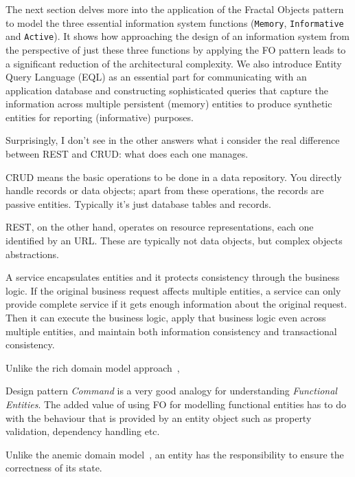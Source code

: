 \documentclass[a4paper,12pt,oneside,openright,final]{memoir} %
\begin{document}
	The next section delves more into the application of the Fractal Objects pattern to model the three essential information system functions (\texttt{Memory}, \texttt{Informative} and \texttt{Active}).
	It shows how approaching the design of an information system from the perspective of just these three functions by applying the FO pattern leads to a significant reduction of the architectural complexity.
	We also introduce Entity Query Language (EQL) as an essential part for communicating with an application database and constructing sophisticated queries that capture the information across multiple persistent (memory) entities to produce synthetic entities for reporting (informative) purposes.


\iffalse


	Surprisingly, I don't see in the other answers what i consider the real difference between REST and CRUD: what does each one manages.

	CRUD means the basic operations to be done in a data repository. You directly handle records or data objects; apart from these operations, the records are passive entities. Typically it's just database tables and records.

	REST, on the other hand, operates on resource representations, each one identified by an URL. These are typically not data objects, but complex objects abstractions.


	
	A service encapsulates entities and it protects consistency through the business logic. 
	If the original business request affects multiple entities, a service can only provide complete service if it gets enough information about the original request.
	Then it can execute the business logic, apply that business logic even across multiple entities, and maintain both information consistency and transactional consistency.
	
	

	Unlike the rich domain model approach~\cite{evans2003},
	
	
	Design pattern \emph{Command} is a very good analogy for understanding \emph{Functional Entities}.
	The added value of using FO for modelling functional entities has to do with the behaviour that is provided by an entity object such as property validation, dependency handling etc.


	Unlike the anemic domain model~\cite{fowler2003}, an entity has the responsibility to ensure the correctness of its state.
	
\end{document}

